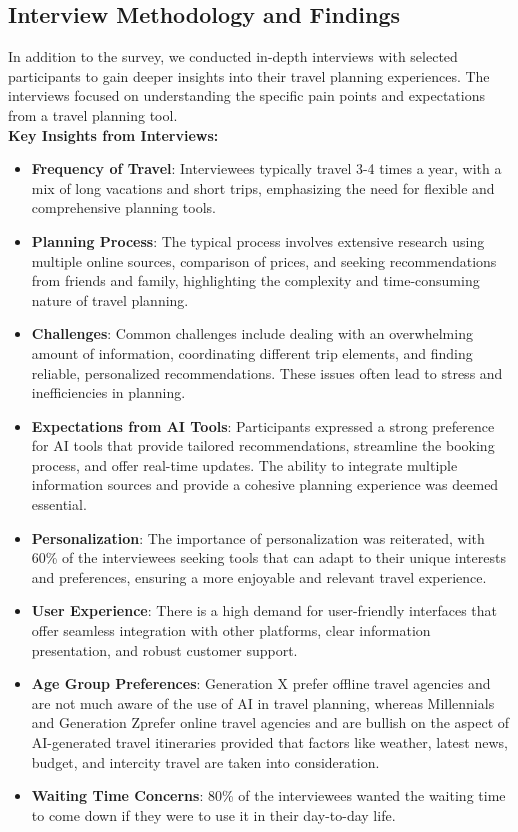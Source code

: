 \documentclass[conference]{IEEEtran}
\begin{document}
    \subsection{Interview Methodology and Findings}
        In addition to the survey, we conducted in-depth interviews with selected participants to gain deeper insights into their travel planning experiences. The interviews focused on understanding the specific pain points and expectations from a travel planning tool.
        \\

        \textbf{Key Insights from Interviews:}

        \begin{itemize}
            \item \textbf{Frequency of Travel}: Interviewees typically travel 3-4 times a year, with a mix of long vacations and short trips, emphasizing the need for flexible and comprehensive planning tools.
            \item \textbf{Planning Process}: The typical process involves extensive research using multiple online sources, comparison of prices, and seeking recommendations from friends and family, highlighting the complexity and time-consuming nature of travel planning.
            \item \textbf{Challenges}: Common challenges include dealing with an overwhelming amount of information, coordinating different trip elements, and finding reliable, personalized recommendations. These issues often lead to stress and inefficiencies in planning.
            \item \textbf{Expectations from AI Tools}: Participants expressed a strong preference for AI tools that provide tailored recommendations, streamline the booking process, and offer real-time updates. The ability to integrate multiple information sources and provide a cohesive planning experience was deemed essential.
            \item \textbf{Personalization}: The importance of personalization was reiterated, with 60\% of the interviewees seeking tools that can adapt to their unique interests and preferences, ensuring a more enjoyable and relevant travel experience.
            \item \textbf{User Experience}: There is a high demand for user-friendly interfaces that offer seamless integration with other platforms, clear information presentation, and robust customer support.
            \item \textbf{Age Group Preferences}: Generation X prefer offline travel agencies and are not much aware of the use of AI in travel planning, whereas Millennials and Generation Zprefer online travel agencies and are bullish on the aspect of AI-generated travel itineraries provided that factors like weather, latest news, budget, and intercity travel are taken into consideration.
            \item \textbf{Waiting Time Concerns}: 80\% of the interviewees wanted the waiting time to come down if they were to use it in their day-to-day life.
        \end{itemize}
\end{document}
